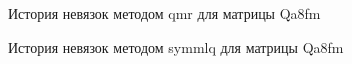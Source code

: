\begin{figure}[H]
    \renewcommand{\figurename}{Рисунок}
    \caption{История невязок методом qmr для матрицы Qa8fm}
    \label{fig:image_20}
\end{figure}

\begin{figure}[H]
    \renewcommand{\figurename}{Рисунок}
    \caption{История невязок методом symmlq для матрицы Qa8fm}
    \label{fig:image_21}
\end{figure}

